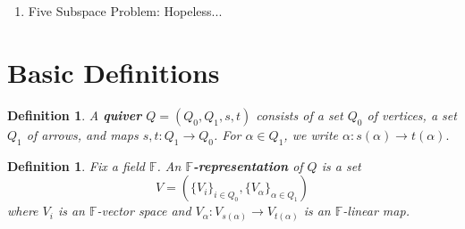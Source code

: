 \documentclass{book}
\newtheorem{definition}[theorem]{Definition}
\newtheorem{example}{Example}[section]
\begin{document}
\begin{enumerate}
				\begin{example}
					Let $\dim V=2$, and consider \[V=\mathbb{C}^2, U_1 = \mathbb{C} \begin{bmatrix}1\\0\end{bmatrix},U_2 = \mathbb{C} \begin{bmatrix}0\\1\end{bmatrix},U_3 = \mathbb{C} \begin{bmatrix}1\\1\end{bmatrix},U_4 = \mathbb{C} \begin{bmatrix}1\\ \lambda\end{bmatrix}\] where $\lambda\neq 0,1$. We need to know this continuous parameter $\lambda$ to distinguish such configurations. 
				\end{example}
			More generally: the endomorphism problem embeds into the four subspace problem. For $f:U\to U$, we consider \[V=U\oplus U, \ U_1=U\oplus 0, \ U_2=0\oplus U, \ U_3=\{(x,x):x\in U\},\ U_4=\{(x,f(x)):x\in U\}.\] A base change in $V$ fixing $U_1,U_2,U_3$ amounts to conjugation of $f$. 
			\item Five Subspace Problem: Hopeless...
		\end{enumerate}
		

  \section{Basic Definitions}
  
	\begin{definition} A \textbf{quiver} $Q=(Q_0,Q_1,s,t)$ consists of a set $Q_0$ of vertices, a set $Q_1$ of arrows, and maps $s,t:Q_1\to Q_0$. For $\alpha\in Q_1$, we write $\alpha:s(\alpha)\to t(\alpha).$
 	 \end{definition}
  
  	\begin{definition} Fix a field $\mathbb{F}$. An \textbf{$\mathbb{F}$-representation} of $Q$ is a set \[V= \left(\{V_i\}_{i\in Q_0},\{V_\alpha\}_{\alpha\in Q_1} \right)\] where $V_i$ is an $\mathbb{F}$-vector space and $V_\alpha : V_{s(\alpha)}\to V_{t(\alpha)}$ is an $\mathbb{F}$-linear map.
   	 \end{definition}
    
\end{document}
